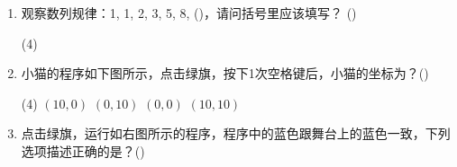 \documentclass[10pt, a4paper]{article}
\newcommand{\hq}{\hfill(\qquad)}
\begin{document}
\begin{enumerate}
        \item 观察数列规律：1, 1, 2, 3, 5, 8, (\qquad)，请问括号里应该填写？ \hq
        \begin{tasks}(4)
        \end{tasks}

        \item 小猫的程序如下图所示，点击绿旗，按下1次空格键后，小猫的坐标为？\hq
        \begin{tasks}(4)
            \task $(10, 0)$
            \task $(0, 10)$
            \task $(0, 0)$
            \task $(10, 10)$
        \end{tasks}

        \item 点击绿旗，运行如右图所示的程序，程序中的蓝色跟舞台上的蓝色一致，下列选项描述正确的是？\hq


\end{enumerate}
\end{document}
